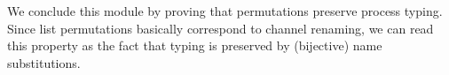 We conclude this module by proving that permutations preserve process typing. Since
list permutations basically correspond to channel renaming, we can read this
property as the fact that typing is preserved by (bijective) name substitutions.

\begin{code}%
\>[0]\AgdaSpace{}%
\AgdaSymbol{:}\AgdaSpace{}%
\AgdaSpace{}%
\AgdaSymbol{\}}\AgdaSpace{}%
\AgdaSpace{}%
\AgdaSpace{}%
\AgdaSpace{}%
\AgdaSpace{}%
\AgdaSpace{}%
\AgdaSpace{}%
\AgdaSpace{}%
\AgdaSpace{}%
\AgdaSpace{}%
\<%
\end{code}
\begin{code}[hide]%
\>[0]\AgdaSpace{}%
\AgdaSpace{}%
\AgdaSymbol{(}\AgdaSpace{}%
\AgdaSymbol{(}\AgdaSpace{}%
\AgdaSpace{}%
\AgdaSpace{}%
\AgdaSpace{}%
\AgdaSymbol{))}\AgdaSpace{}%
\AgdaSpace{}%
\AgdaSpace{}%
\AgdaSpace{}%
\<%
\\
\>[0]\AgdaSpace{}%
\AgdaSymbol{|}\AgdaSpace{}%
\AgdaSymbol{\AgdaUnderscore{}}\AgdaSpace{}%
\AgdaOperator{\AgdaInductiveConstructor{,}}\AgdaSpace{}%
\AgdaSpace{}%
\AgdaOperator{\AgdaInductiveConstructor{,}}\AgdaSpace{}%
\AgdaSpace{}%
\AgdaSpace{}%
\AgdaSpace{}%
\AgdaSpace{}%
\AgdaSymbol{=}\AgdaSpace{}%
\AgdaSpace{}%
\AgdaSymbol{(}\AgdaSpace{}%
\AgdaSpace{}%
\AgdaSpace{}%
\AgdaSpace{}%
\AgdaSymbol{)}\<%
\\
\>[0]\AgdaSpace{}%
\AgdaSpace{}%
\AgdaSymbol{(}\AgdaSpace{}%
\AgdaSymbol{(}\AgdaSpace{}%
\AgdaSpace{}%
\AgdaSpace{}%
\AgdaSpace{}%
\AgdaSymbol{))}\AgdaSpace{}%
\AgdaSpace{}%
\AgdaSpace{}%

\end{code}
